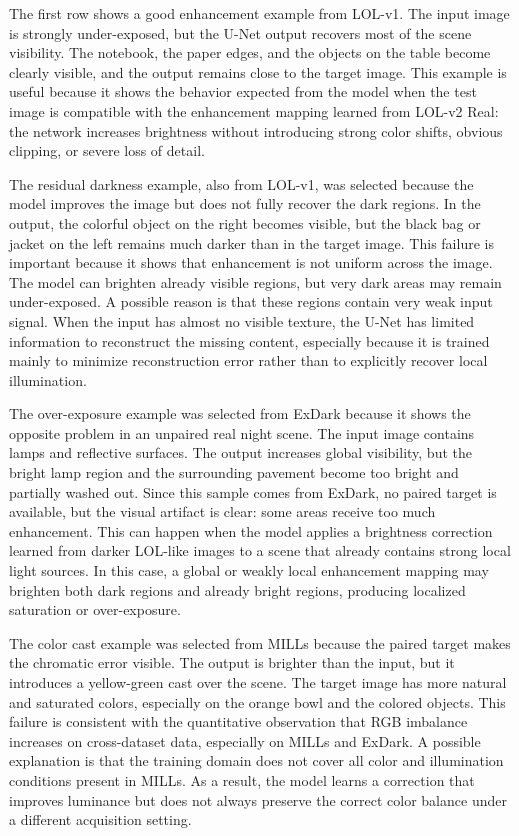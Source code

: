 

The first row shows a good enhancement example from LOL-v1. The input image is strongly under-exposed, but the U-Net output recovers most of the scene visibility. The notebook, the paper edges, and the objects on the table become clearly visible, and the output remains close to the target image. This example is useful because it shows the behavior expected from the model when the test image is compatible with the enhancement mapping learned from LOL-v2 Real: the network increases brightness without introducing strong color shifts, obvious clipping, or severe loss of detail.

The residual darkness example, also from LOL-v1, was selected because the model improves the image but does not fully recover the dark regions. In the output, the colorful object on the right becomes visible, but the black bag or jacket on the left remains much darker than in the target image. This failure is important because it shows that enhancement is not uniform across the image. The model can brighten already visible regions, but very dark areas may remain under-exposed. A possible reason is that these regions contain very weak input signal. When the input has almost no visible texture, the U-Net has limited information to reconstruct the missing content, especially because it is trained mainly to minimize reconstruction error rather than to explicitly recover local illumination.

The over-exposure example was selected from ExDark because it shows the opposite problem in an unpaired real night scene. The input image contains lamps and reflective surfaces. The output increases global visibility, but the bright lamp region and the surrounding pavement become too bright and partially washed out. Since this sample comes from ExDark, no paired target is available, but the visual artifact is clear: some areas receive too much enhancement. This can happen when the model applies a brightness correction learned from darker LOL-like images to a scene that already contains strong local light sources. In this case, a global or weakly local enhancement mapping may brighten both dark regions and already bright regions, producing localized saturation or over-exposure.

The color cast example was selected from MILLs because the paired target makes the chromatic error visible. The output is brighter than the input, but it introduces a yellow-green cast over the scene. The target image has more natural and saturated colors, especially on the orange bowl and the colored objects. This failure is consistent with the quantitative observation that RGB imbalance increases on cross-dataset data, especially on MILLs and ExDark. A possible explanation is that the training domain does not cover all color and illumination conditions present in MILLs. As a result, the model learns a correction that improves luminance but does not always preserve the correct color balance under a different acquisition setting.


